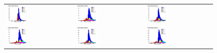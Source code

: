 \begin{figure}[h!]
\label{fig:samplot0}
\centering
\begin{tabular}{l  l  l}
  \includegraphics[width=0.33\textwidth]{plots/mc_breakdown_comp_0_bin_0_att_0} 
  &\includegraphics[width=0.33\textwidth]{plots/mc_breakdown_comp_0_bin_1_att_0}  
  &\includegraphics[width=0.33\textwidth]{plots/mc_breakdown_comp_0_bin_2_att_0} \\
  \includegraphics[width=0.33\textwidth]{plots/mc_breakdown_comp_0_bin_3_att_0} 
  &\includegraphics[width=0.33\textwidth]{plots/mc_breakdown_comp_0_bin_4_att_0} 
  &\includegraphics[width=0.33\textwidth]{plots/mc_breakdown_comp_0_bin_5_att_0}  

\end{tabular}
\end{figure}
